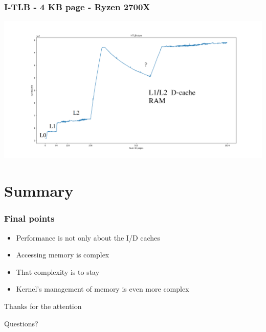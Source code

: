 \documentclass{beamer}
\begin{document}
\begin{frame}
\frametitle{I-TLB - 4 KB page - Ryzen 2700X}
\includegraphics[scale=.18]{img/itlb_size_zen.png}
\end{frame}

\section{Summary}

\begin{frame}
\frametitle{Final points}
\begin{itemize}
\item Performance is not only about the I/D caches
\item Accessing memory is complex
\item That complexity is to stay
\item Kernel's management of memory is even more complex
\end{itemize}

\end{frame}

\begin{frame}
\Huge{\centerline{Thanks for the attention}}
\Huge{\centerline{Questions?}}
\end{frame}

\end{document}
